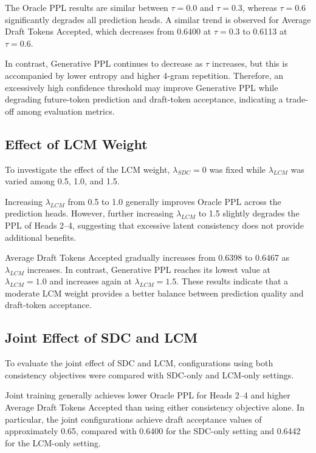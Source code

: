 The Oracle PPL results are similar between $\tau=0.0$ and $\tau=0.3$,
whereas $\tau=0.6$ significantly degrades all prediction heads. A similar
trend is observed for Average Draft Tokens Accepted, which decreases from
0.6400 at $\tau=0.3$ to 0.6113 at $\tau=0.6$.

In contrast, Generative PPL continues to decrease as $\tau$ increases,
but this is accompanied by lower entropy and higher 4-gram repetition.
Therefore, an excessively high confidence threshold may improve
Generative PPL while degrading future-token prediction and draft-token
acceptance, indicating a trade-off among evaluation metrics.

\subsection{Effect of LCM Weight}\label{subsece:effect_of_lcm_weight}

To investigate the effect of the LCM weight, $\lambda_{SDC}=0$ was fixed while
$\lambda_{LCM}$ was varied among 0.5, 1.0, and 1.5.

Increasing $\lambda_{LCM}$ from 0.5 to 1.0 generally improves Oracle PPL across
the prediction heads. However, further increasing $\lambda_{LCM}$ to 1.5 slightly
degrades the PPL of Heads 2--4, suggesting that excessive latent
consistency does not provide additional benefits.

Average Draft Tokens Accepted gradually increases from 0.6398 to 0.6467
as $\lambda_{LCM}$ increases. In contrast, Generative PPL reaches its lowest value
at $\lambda_{LCM}=1.0$ and increases again at $\lambda_{LCM}=1.5$. 
These results indicate that a moderate LCM weight provides a better
balance between prediction quality and draft-token acceptance.

\subsection{Joint Effect of SDC and LCM}\label{subsece:effect_of_joint_effect}

To evaluate the joint effect of SDC and LCM, configurations using both
consistency objectives were compared with SDC-only and LCM-only settings.

Joint training generally achieves lower Oracle PPL for Heads 2--4 and
higher Average Draft Tokens Accepted than using either consistency
objective alone. In particular, the joint configurations achieve draft
acceptance values of approximately 0.65, compared with 0.6400 for the
SDC-only setting and 0.6442 for the LCM-only setting.

